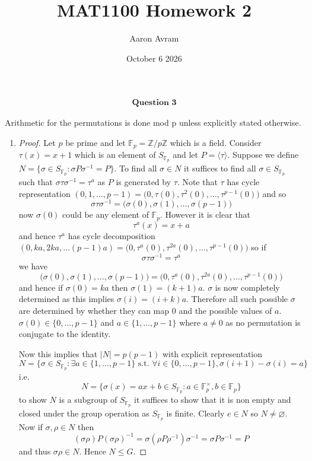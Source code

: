 \documentclass[12pt]{article}
\title{MAT1100 Homework 2}
\author{Aaron Avram}
\date{October 6 2026}
\begin{document}
\newtheorem{definition}{Definition}
\newtheorem{theorem}{Theorem}
\newtheorem{claim}{Claim}
\newtheorem{corollary}{Corollary}

\maketitle

\begin{align*}
    \textbf{Question 3}
\end{align*}

Arithmetic for the permutations is done mod p unless explicitly stated otherwise.
\begin{enumerate}
    \item[(a)]
    \begin{proof}
        Let $p$ be prime and let $\mathbb F_p = \mathbb Z/p\mathbb Z$ which is a field.
        Consider $\tau(x) = x+1$ which is an element of $S_{\mathbb F_p}$ and let $P = \langle \tau \rangle$.
        Suppose we define $N = \{ \sigma \in S_{\mathbb F_p}: \sigma P \sigma^{-1} = P \}$.
        To find all $\sigma \in N$ it suffices to find all $\sigma \in S_{\mathbb F_p}$ such that $\sigma \tau \sigma^{-1} = \tau^a$
        as $P$ is generated by $\tau$. Note that $\tau$ has cycle representation $(0,1,\ldots, p-1) = \Big(0, \tau(0), \tau^2(0), \ldots, \tau^{p-1}(0)\Big)$
        and so
        \[ \sigma \tau \sigma^{-1} = \Big(\sigma(0),\sigma(1),\ldots,\sigma(p-1)\Big) \]
        now $\sigma(0)$ could be any element of $\mathbb F_p$. However it is clear that
        \[ \tau^a(x) = x + a \]
        and hence $\tau^a$ has cycle decomposition $(0, ka, 2ka, \ldots (p-1)a) = \Big(0, \tau^a(0), \tau^{2a}(0), \ldots, \tau^{p-1}(0)\Big)$
        so if
        \[ \sigma \tau \sigma^{-1} = \tau^a \]
        we have
        \[ \Big(\sigma(0),\sigma(1),\ldots,\sigma(p-1)\Big) = \Big(0, \tau^a(0), \tau^{2a}(0), \ldots, \tau^{p-1}(0)\Big) \]
        and hence if $\sigma(0) = ka$ then $\sigma(1) = (k+1)a$.
        $\sigma$ is now completely determined as this implies $\sigma(i) = (i + k)a$.
        Therefore all such possible $\sigma$ are determined by whether they can map $0$ and the possible values of $a$.
        $\sigma(0) \in \{ 0, \ldots, p-1 \}$ and $a \in \{ 1, \ldots, p-1 \}$ where $a \neq 0$ as no permutation
        is conjugate to the identity.

        Now this implies that $|N| = p(p-1)$ with explicit representation
        \[ N = \{ \sigma \in S_{\mathbb F_p}: \exists a \in \{ 1, \ldots, p-1 \} \text{ s.t. } \forall i \in \{ 0, \ldots, p-1\}, \sigma(i+1) - \sigma(i) = a \} \]
        i.e.
        \[ N = \{ \sigma(x) = ax + b \in S_{\mathbb F_p}: a \in \mathbb F_p^\times, b \in \mathbb F_p \} \]
        to show $N$ is a subgroup of $S_{\mathbb F_p}$ it suffices to show that it is non empty
        and closed under the group operation as $S_{\mathbb F_p}$ is finite.
        Clearly $e \in N$ so $N \neq \varnothing$. Now if $\sigma, \rho \in N$ then
        \[ (\sigma \rho)P(\sigma \rho)^{-1} = \sigma(\rho P \rho^{-1})\sigma^{-1} = \sigma P \sigma^{-1} = P \]
        and thus $\sigma\rho \in N$. Hence $N \leq G$.


\end{proof}
\end{enumerate}
\end{document}
